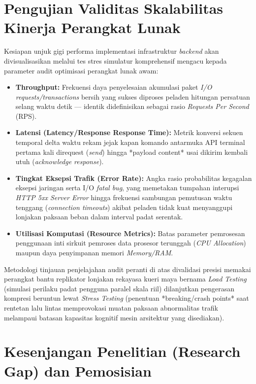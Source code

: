 \section{Pengujian Validitas Skalabilitas Kinerja Perangkat Lunak}

Kesiapan unjuk gigi performa implementasi infrastruktur \textit{backend} akan divisualisasikan melalui tes stres simulatur komprehensif mengacu kepada parameter audit optimisasi perangkat lunak awam:
\begin{itemize}
	\item \textbf{Throughput:} Frekuensi daya penyelesaian akumulasi paket \textit{I/O requests/transactions} bersih yang sukses diproses peladen hitungan persatuan selang waktu detik — identik didefinisikan sebagai rasio \textit{Requests Per Second} (RPS).
	\item \textbf{Latensi (Latency/Response Response Time):} Metrik konversi sekuen temporal delta waktu rekam jejak kapan komando antarmuka API terminal pertama kali direquest (\textit{send}) hingga *payload content* usai dikirim kembali utuh (\textit{acknowledge response}).
	\item \textbf{Tingkat Eksepsi Trafik (Error Rate):} Angka rasio probabilitas kegagalan eksepsi jaringan serta I/O \textit{fatal bug}, yang memetakan tumpahan interupsi \textit{HTTP 5xx Server Error} hingga frekuensi sambungan pemutusan waktu tenggang (\textit{connection timeouts}) akibat peladen tidak kuat menyanggupi lonjakan paksaan beban dalam interval padat serentak.
	\item \textbf{Utilisasi Komputasi (Resource Metrics):} Batas parameter pemrosesan penggunaan inti sirkuit pemroses data prosesor terunggah (\textit{CPU Allocation}) maupun daya penyimpanan memori \textit{Memory/RAM}.
\end{itemize}
Metodologi tinjauan penjelajahan audit peranti di atas divalidasi presisi memakai perangkat bantu replikator lonjakan rekayasa kueri maya bernama \textit{Load Testing} (simulasi perilaku padat pengguna paralel skala riil) dilanjutkan pengerasan kompresi beruntun lewat \textit{Stress Testing} (penentuan *breaking/crash points* saat rentetan lalu lintas memprovokasi muatan paksaan abnormalitas trafik melampaui batasan kapasitas kognitif mesin arsitektur yang disediakan).

\section{Kesenjangan Penelitian (Research Gap) dan Pemosisian}

